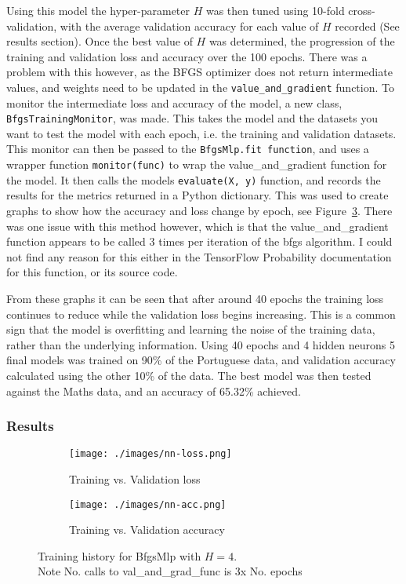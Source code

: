 \documentclass[12pt,a4paper,titlepage,twoside]{report}
\begin{document}
	Using this model the hyper-parameter $H$ was then tuned using 10-fold cross-validation, with the average validation accuracy for each value of $H$ recorded (See results section). Once the best value of $H$ was determined, the progression of the training and validation loss and accuracy over the 100 epochs. There was a problem with this however, as the BFGS optimizer does not return intermediate values, and weights need to be updated in the \texttt{value_and_gradient} function. To monitor the intermediate loss and accuracy of the model, a new class, \texttt{BfgsTrainingMonitor}, was made. This takes the model and the datasets you want to test the model with each epoch, i.e. the training and validation datasets. This monitor can then be passed to the \texttt{BfgsMlp.fit function}, and uses a wrapper function \texttt{monitor(func)} to wrap the value_and_gradient function for the model. It then calls the models \texttt{evaluate(X, y)} function, and records the results for the metrics returned in a Python dictionary. This was used to create graphs to show how the accuracy and loss change by epoch, see Figure~\ref{fig:nn-loss-acc}. There was one issue with this method however, which is that the value_and_gradient function appears to be called 3 times per iteration of the bfgs algorithm. I could not find any reason for this either in the TensorFlow Probability documentation for this function, or its source code. \par
	From these graphs it can be seen that after around 40 epochs the training loss continues to reduce while the validation loss begins increasing. This is a common sign that the model is overfitting and learning the noise of the training data, rather than the underlying information\cite{overfitting}. Using 40 epochs and 4 hidden neurons 5 final models was trained on 90\% of the Portuguese data, and validation accuracy calculated using the other 10\% of the data. The best model was then tested against the Maths data, and an accuracy of 65.32\% achieved.

\subsubsection*{Results}
	\begin{figure}[h]
		\centering
		\begin{subfigure}{0.5\textwidth}
	  		\centering
  			\texttt{[image: ./images/nn-loss.png]}
  			\caption{Training vs. Validation loss}
  			\label{fig:nn-loss}
		\end{subfigure}%
		\begin{subfigure}{0.5\textwidth}
  			\centering
	  		\texttt{[image: ./images/nn-acc.png]}
  			\caption{Training vs. Validation accuracy}
 			\label{fig:nn-acc}
		\end{subfigure}
		\caption{Training history for BfgsMlp with $H = 4$.\\ \small{Note No. calls to val_and_grad_func is 3x No. epochs}}
		\label{fig:nn-loss-acc}
	\end{figure}
	
\end{document}
